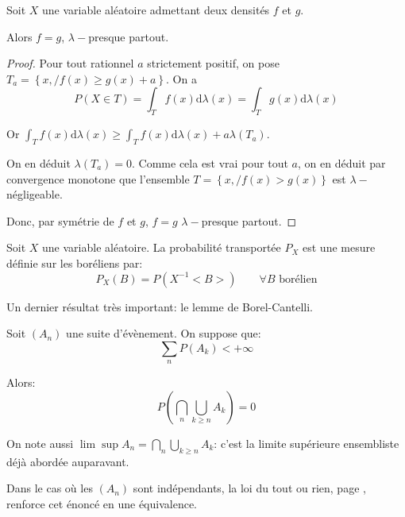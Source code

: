 \begin{prop}
\label{unicite_densite}
Soit $X$ une variable aléatoire admettant deux densités $f$ et $g$.

Alors $f=g$, $\lambda-$presque partout.
\end{prop}

\begin{proof}
Pour tout rationnel $a$ strictement positif, on pose $T_a=\left \{ x, / f(x) \geq g(x)+a \right \}$. On a
\[
P(X \in T) = \displaystyle{\int_T} f(x) \mathrm d \lambda(x) = \displaystyle{\int_T} g(x) \mathrm d \lambda(x)
\]

Or $\displaystyle{\int_T} f(x) \mathrm d \lambda(x) \geq \displaystyle{\int_T} f(x) \mathrm d \lambda(x) + a \lambda(T_a)$.

On en déduit $\lambda(T_a)=0$. Comme cela est vrai pour tout $a$, on en déduit par convergence monotone que l'ensemble $T =\left \{ x, / f(x) > g(x) \right \}$ est $\lambda-$négligeable.

Donc, par symétrie de $f$ et $g$, $f=g$ $\lambda-$presque partout.
\end{proof}

\begin{de}
Soit $X$ une variable aléatoire. La probabilité transportée $P_X$ est une mesure définie sur les boréliens par:
\[
P_X(B) = P\left ( X^{-1}<B> \right ) \qquad \forall B \text{ borélien}
\]
\end{de}

Un dernier résultat très important: le lemme de Borel-Cantelli.


\begin{lem}
Soit $(A_n)$ une suite d'évènement. On suppose que:
\[
\displaystyle{\sum \limits_n} P(A_k) < +\infty
\]

Alors:
\[
P \left ( \bigcap \limits_n \bigcup \limits_{k \geq n} A_k \right ) = 0
\]
\end{lem}

\begin{listremarques}
\item
On note aussi $\lim \sup A_n = \bigcap \limits_n \bigcup \limits_{k \geq n} A_k$: c'est la limite supérieure ensembliste déjà abordée auparavant.
\item
Dans le cas où les $(A_n)$ sont indépendants, la loi du tout ou rien, page \pageref{tout_ou_rien}, renforce cet énoncé en une équivalence.
\end{listremarques}

